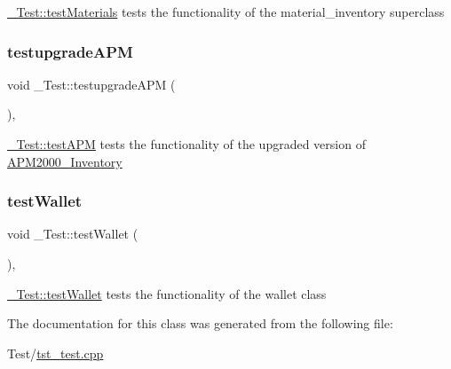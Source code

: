 \mbox{\hyperlink{class__Test_ad5396e54792008660924db2e16edb614}{\+\_\+\+Test\+::test\+Materials}} tests the functionality of the material\+\_\+inventory superclass 

\mbox{\label{class__Test_aaf9ee0b20b1e17a5aebfa740ed493d6e}} 
\subsubsection{\texorpdfstring{testupgradeAPM}{testupgradeAPM}}
{\footnotesize\ttfamily void \+\_\+\+Test\+::testupgrade\+A\+PM (\begin{DoxyParamCaption}{ }\end{DoxyParamCaption})\hspace{0.3cm}{\ttfamily [private]}, {\ttfamily [slot]}}



\mbox{\hyperlink{class__Test_adb7f71ea12e1b02afd6b4d1f7d65c1eb}{\+\_\+\+Test\+::test\+A\+PM}} tests the functionality of the upgraded version of \mbox{\hyperlink{classAPM2000__Inventory}{A\+P\+M2000\+\_\+\+Inventory}} 

\mbox{\label{class__Test_afbce4b6817db0c8423dd4296a18f75de}} 
\subsubsection{\texorpdfstring{testWallet}{testWallet}}
{\footnotesize\ttfamily void \+\_\+\+Test\+::test\+Wallet (\begin{DoxyParamCaption}{ }\end{DoxyParamCaption})\hspace{0.3cm}{\ttfamily [private]}, {\ttfamily [slot]}}



\mbox{\hyperlink{class__Test_afbce4b6817db0c8423dd4296a18f75de}{\+\_\+\+Test\+::test\+Wallet}} tests the functionality of the wallet class 



The documentation for this class was generated from the following file\+:\begin{DoxyCompactItemize}
\item 
Test/\mbox{\hyperlink{tst__test_8cpp}{tst\+\_\+test.\+cpp}}\end{DoxyCompactItemize}
